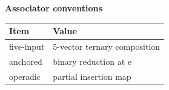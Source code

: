 \begin{center}
\textbf{Associator conventions}\par\smallskip
\begin{tabular}{ll}
\toprule
Item & Value \\
\midrule
five-input & 5-vector ternary composition \\
anchored & binary reduction at e \\
operadic & partial insertion map \\
\bottomrule
\end{tabular}
\end{center}
